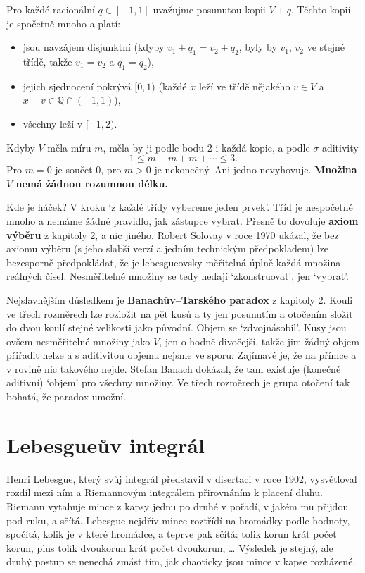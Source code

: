 Pro každé racionální $q\in[-1, 1]$ uvažujme posunutou kopii $V + q$. Těchto kopií je spočetně mnoho a platí:
\begin{itemize}
  \item jsou navzájem disjunktní (kdyby $v_1 + q_1 = v_2 + q_2$, byly by $v_1$, $v_2$ ve stejné třídě, takže $v_1 = v_2$ a $q_1 = q_2$),
  \item jejich sjednocení pokrývá $[0, 1)$ (každé $x$ leží ve třídě nějakého $v\in V$ a $x - v\in\mathbb{Q}\cap(-1, 1)$),
  \item všechny leží v $[-1, 2)$.
\end{itemize}
Kdyby $V$ měla míru $m$, měla by ji podle bodu 2 i každá kopie, a podle $\sigma$-aditivity
\begin{equation*}
  1\leq m + m + m + \cdots\leq 3.
\end{equation*}
Pro $m = 0$ je součet $0$, pro $m > 0$ je nekonečný. Ani jedno nevyhovuje. \textbf{Množina $V$ nemá žádnou rozumnou délku.}

Kde je háček? V kroku `z každé třídy vybereme jeden prvek'. Tříd je nespočetně mnoho a nemáme žádné pravidlo, jak zástupce vybrat. Přesně to dovoluje \textbf{axiom výběru} z kapitoly 2, a nic jiného. Robert Solovay v roce 1970 ukázal, že bez axiomu výběru (s jeho slabší verzí a jedním technickým předpokladem) lze bezesporně předpokládat, že je lebesgueovsky měřitelná úplně každá množina reálných čísel. Nesměřitelné množiny se tedy nedají `zkonstruovat', jen `vybrat'.

Nejslavnějším důsledkem je \textbf{Banachův--Tarského paradox} z kapitoly 2. Kouli ve třech rozměrech lze rozložit na pět kusů a ty jen posunutím a otočením složit do dvou koulí stejné velikosti jako původní. Objem se `zdvojnásobil'. Kusy jsou ovšem nesměřitelné množiny jako $V$, jen o hodně divočejší, takže jim žádný objem přiřadit nelze a s aditivitou objemu nejsme ve sporu. Zajímavé je, že na přímce a v rovině nic takového nejde. Stefan Banach dokázal, že tam existuje (konečně aditivní) `objem' pro všechny množiny. Ve třech rozměrech je grupa otočení tak bohatá, že paradox umožní.

\section{Lebesgueův integrál}

Henri Lebesgue, který svůj integrál představil v disertaci v roce 1902, vysvětloval rozdíl mezi ním a Riemannovým integrálem přirovnáním k placení dluhu. Riemann vytahuje mince z kapsy jednu po druhé v pořadí, v jakém mu přijdou pod ruku, a sčítá. Lebesgue nejdřív mince roztřídí na hromádky podle hodnoty, spočítá, kolik je v které hromádce, a teprve pak sčítá: tolik korun krát počet korun, plus tolik dvoukorun krát počet dvoukorun, \dots{} Výsledek je stejný, ale druhý postup se nenechá zmást tím, jak chaoticky jsou mince v kapse rozházené.

